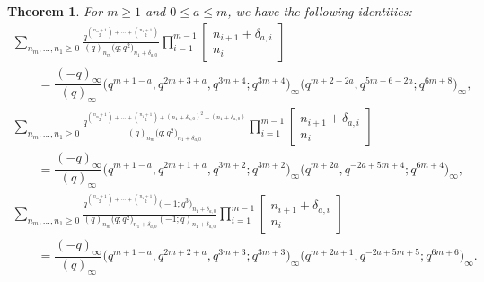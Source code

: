 \documentclass[pdftex]{sigma}
\newtheorem{Theorem}{Theorem}[section]
\numberwithin{equation}{section}
\begin{document}
\begin{Theorem}
\label{thm:quintuple}
For $m\geq 1$ and $0\leq a\leq m$, we have the following identities:
\begin{gather}
		\sum_{n_m, \dots, n_1 \geq 0} \frac{q^{\binom{n_m + 1}{2} + \cdots + \binom{n_1+1}{2}}}{(q)_{n_m}\bigl(q;q^2\bigr)_{n_1 + \delta_{a,0}}} \prod_{i=1}^{m-1}\begin{bmatrix} n_{i+1} + \delta_{a,i} \\ n_i \end{bmatrix} \nonumber\\
		\qquad{}= \dfrac{(-q)_\infty}{(q)_\infty}\bigl(q^{m+1-a},q^{2m+3+a},q^{3m+4};q^{3m+4}\bigr)_{\infty}\bigl(q^{m+2+2a},q^{5m+6-2a};q^{6m+8}\bigr)_{\infty},
\label{eqn:quintex1} \\
		\sum_{n_m,\dots ,n_1 \geq 0} \frac{q^{\binom{n_m + 1}{2} + \cdots + \binom{n_1+1}{2}+ (n_1+\delta_{a,0})^2-(n_1+\delta_{a,0})}}{(q)_{n_m} \bigl(q;q^2\bigr)_{n_1 + \delta_{a,0}}} \prod_{i=1}^{m-1} %
		\begin{bmatrix} n_{i+1} + \delta_{a,i} \\ n_i \end{bmatrix}
		\nonumber \\
		\qquad{}=
		\dfrac{(-q)_\infty}{(q)_\infty}
		\bigl(q^{m+1-a}, q^{2m+1+a}, q^{3m+2} ; q^{3m+2}\bigr)_\infty \bigl(q^{m+2a},q^{-2a+5m+4} ;q^{6m+4}\bigr)_\infty,
\label{eqn:quintex2} \\
		\sum_{n_m,\dots ,n_1 \geq 0}
		\frac{q^{\binom{n_m + 1}{2} + \cdots + \binom{n_1+1}{2}}\bigl(-1;q^3\bigr)_{n_1+\delta_{a,0}}}
		{(q)_{n_m} \bigl(q;q^2\bigr)_{n_1 + \delta_{a,0}}(-1;q)_{n_1+\delta_{a,0}}} \prod_{i=1}^{m-1} %
		\begin{bmatrix} n_{i+1} + \delta_{a,i} \\ n_i \end{bmatrix} \nonumber\\
		\qquad{}=
		\dfrac{(-q)_\infty}{(q)_\infty}
		\bigl(q^{m+1-a}, q^{2m+2+a}, q^{3m+3} ; q^{3m+3}\bigr)_\infty \bigl(q^{m+2a+1},q^{-2a+5m+5} ;q^{6m+6}\bigr)_\infty.
\label{eqn:quintex3}
\end{gather}

\end{Theorem}
\end{document}
